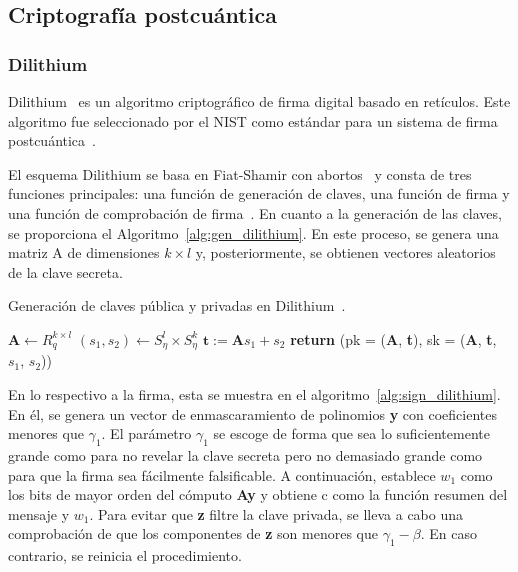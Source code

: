 \subsection{Criptografía postcuántica}\label{subsec:postcuantica}

\subsubsection{Dilithium}\label{subsubsec:dilithium}

Dilithium~\cite{dilithium} es un algoritmo criptográfico de firma digital basado en retículos.
Este algoritmo fue seleccionado por el \ac{NIST} como estándar para un sistema de firma postcuántica~\cite{nist_sel}.

El esquema Dilithium se basa en Fiat-Shamir con abortos~\cite{10.1007/978-3-642-10366-7_35} y consta de tres funciones principales: una función de generación de claves, una función de firma y una función de comprobación de firma~\cite{dilithium_spec}.
En cuanto a la generación de las claves, se proporciona el Algoritmo~\ref{alg:gen_dilithium}.
En este proceso, se genera una matriz A de dimensiones $k \times l$ y, posteriormente, se obtienen vectores aleatorios de la clave secreta.

\begin{algorithm}
    \caption{Generación de claves pública y privadas en Dilithium~\cite{dilithium_spec}.}
    \label{alg:gen_dilithium}
    \hspace{2mm}$\textbf{A} \gets R_q^{k\times l}$\newline
    $(s_1,s_2) \gets S_\eta^l \times S_\eta^{k}$\newline
    $\textbf{t} := \textbf{A}s_1 + s_2$\newline
    \textbf{return} (pk = (\textbf{A}, \textbf{t}), sk = (\textbf{A}, \textbf{t}, $s_1$, $s_2$))
\end{algorithm}

En lo respectivo a la firma, esta se muestra en el algoritmo~\ref{alg:sign_dilithium}.
En él, se genera un vector de enmascaramiento de polinomios \textbf{y} con coeficientes menores que $\gamma_1$.
El parámetro $\gamma_1$ se escoge de forma que sea lo suficientemente grande como para no revelar la clave secreta pero no demasiado grande como para que la firma sea fácilmente falsificable.
A continuación, establece $w_1$ como los bits de mayor orden del cómputo \textbf{Ay} y obtiene c como la función resumen del mensaje y $w_1$.
Para evitar que \textbf{z} filtre la clave privada, se lleva a cabo una comprobación de que los componentes de \textbf{z} son menores que $\gamma_1 - \beta$.
En caso contrario, se reinicia el procedimiento.

